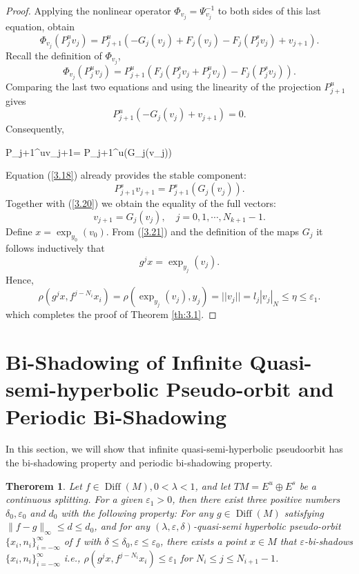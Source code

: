 \documentclass[12pt]{article}
\newtheorem{theorem}{Therorem}[section]
\begin{document}
\begin{proof}
	
	Applying the nonlinear operator $ \Phi_{v_{j}}=\Psi_{v_{j}}^{-1} $ to both sides of this last equation, obtain
	$$
	\Phi_{v_{j}}(P_{j}^{u}v_{j})=P_{j+1}^{u}(-G_{j}(v_{j})+F_{j}(v_{j})-F_{j}(P_{j}^{s}v_{j})+v_{j+1}).
	$$
	Recall the definition of $ \Phi_{v_{j}} $,
	$$
	\Phi_{v_{j}}(P_{j}^{u}v_{j})=P_{j+1}^{u}(F_{j}(P_{j}^{s}v_{j}+P_{j}^{u}v_{j})-F_{j}(P_{j}^{s}v_{j})).
	$$
	Comparing the last two equations and using the linearity of the projection $ P_{j+1}^{u} $ gives 
	$$ P_{j+1}^{u}(-G_{j}(v_{j})+v_{j+1})=0. $$
	Consequently,
	\begin{flalign}\label{3.20}
		\begin{split}
			P_{j+1}^{u}v_{j+1}= P_{j+1}^{u}(G_{j}(v_{j}))
		\end{split}
	\end{flalign}
	Equation (\ref{3.18}) already provides the stable component:
	$$
	P_{j+1}^{s}v_{j+1}=P_{j+1}^{s}(G_{j}(v_{j})).
	$$
	Together with (\ref{3.20}) we obtain the equality of the full vectors:
	\begin{equation}\label{3.21}
		v_{j+1}=G_{j}(v_{j}),\quad j=0,1,\cdots,N_{k+1}-1.
	\end{equation}
	Define $ x=\exp_{y_0}(v_0)$. From (\ref{3.21}) and the definition of the maps $ G_{j} $ it follows inductively that
	$$
	g^{j}x=\exp_{y_j}(v_j).
	$$
	Hence,
	$$
	\rho(g^{j} x,f^{j-N_{i}}x_i)=\rho(\exp_{y_j}(v_j),y_j)=||v_j||=l_{j}|v_j|_{N}\leqslant \eta \leqslant \varepsilon_1.
	$$
	which completes the proof of Theorem \ref{th:3.1}.
\end{proof}


\hfuzz=1pt
\section{Bi-Shadowing of Infinite Quasi-semi-hyperbolic Pseudo-orbit and Periodic Bi-Shadowing}\label{Section 4}

In this section, we will show that infinite quasi-semi-hyperbolic pseudoorbit has the  bi-shadowing property and periodic bi-shadowing property. 

\begin{theorem}\label{th:4.1}
	Let $f \in \operatorname{Diff}(M),0 < \lambda < 1 $, and let $TM=E^u \oplus E^s$ be a continuous splitting. For a given $ \varepsilon_1>0 $, then there exist three positive numbers   $\delta_0, \varepsilon_0$ and $d_0$ with the following property: For any $g \in \operatorname{Diff}(M)$ satisfying $ \|f - g\|_\infty\leqslant d \leqslant d_0 $, and for any  $(\lambda,\varepsilon,\delta)$-quasi-semi hyperbolic pseudo-orbit $  \{x_{i},n_{i}\}_{i=-\infty}^{\infty} $ of $ f $ with $ \delta\leqslant\delta_0,\varepsilon\leqslant\varepsilon_0 $, there exists a point $ x\in M $ that $ \varepsilon $-bi-shadows $ \{x_{i},n_{i}\}_{i=-\infty}^{\infty}$ i.e., $ \rho(g^j x,f^{j-N_{i}}x_{i})\leqslant\varepsilon_1 $ for $ N_{i}\leqslant j\leqslant N_{i+1}-1 $.
\end{theorem}
\end{document}
